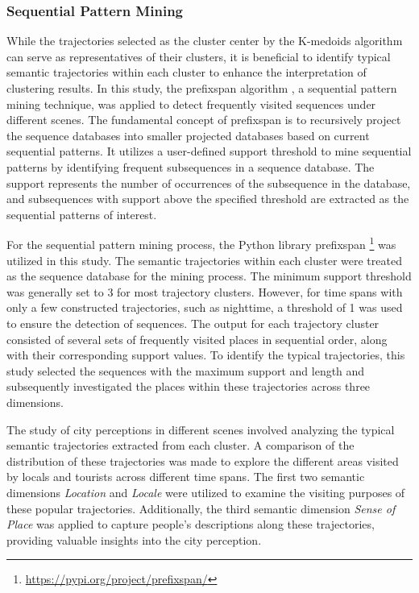 \documentclass{article}
\theoremstyle{definition}
\theoremstyle{remark}
\begin{document}
\subsubsection{Sequential Pattern Mining}
While the trajectories selected as the cluster center by the K-medoids algorithm can serve as representatives of their clusters, it is beneficial to identify typical semantic trajectories within each cluster to enhance the interpretation of clustering results. In this study, the \acrfull{prefixspan} algorithm \citep{pei_mining_2004}, a sequential pattern mining technique, was applied to detect frequently visited sequences under different scenes. The fundamental concept of \acrshort{prefixspan} is to recursively project the sequence databases into smaller projected databases based on current sequential patterns. It utilizes a user-defined support threshold to mine sequential patterns by identifying frequent subsequences in a sequence database. The support represents the number of occurrences of the subsequence in the database, and subsequences with support above the specified threshold are extracted as the sequential patterns of interest.

For the sequential pattern mining process, the Python library prefixspan \footnote{\url{https://pypi.org/project/prefixspan/}} was utilized in this study. The semantic trajectories within each cluster were treated as the sequence database for the mining process. The minimum support threshold was generally set to 3 for most trajectory clusters. However, for time spans with only a few constructed trajectories, such as nighttime, a threshold of 1 was used to ensure the detection of sequences. The output for each trajectory cluster consisted of several sets of frequently visited places in sequential order, along with their corresponding support values. To identify the typical trajectories, this study selected the sequences with the maximum support and length and subsequently investigated the places within these trajectories across three dimensions.

The study of city perceptions in different scenes involved analyzing the typical semantic trajectories extracted from each cluster. A comparison of the distribution of these trajectories was made to explore the different areas visited by locals and tourists across different time spans. The first two semantic dimensions \textit{Location} and \textit{Locale} were utilized to examine the visiting purposes of these popular trajectories. Additionally, the third semantic dimension \textit{Sense of Place} was applied to capture people's descriptions along these trajectories, providing valuable insights into the city perception.
\end{document}
